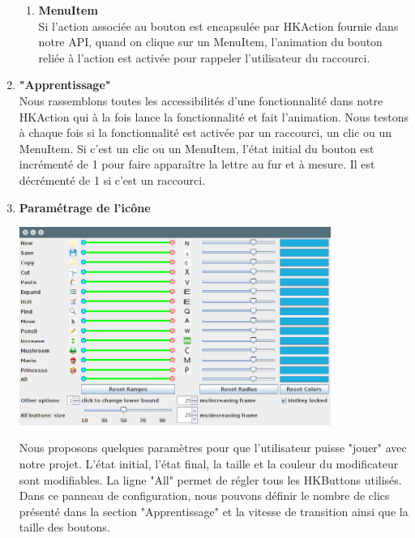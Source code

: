 \documentclass[12pt,a4paper]{article}
\begin{document}
\begin{enumerate}
\begin{enumerate}
\item {\large \textbf{MenuItem}}\\
Si l'action associée au bouton est encapsulée par HKAction fournie dans notre API, quand on clique sur un MenuItem, l'animation du bouton reliée à l'action est activée pour rappeler l'utilisateur du raccourci.
\end{enumerate}
\item {\large \textbf{"Apprentissage"}}\\
Nous rassemblons toutes les accessibilités d'une fonctionnalité dans notre HKAction qui à la fois lance la fonctionnalité et fait l'animation. Nous testons à chaque fois si la fonctionnalité est activée par un raccourci, un clic ou un MenuItem. Si c'est un clic ou un MenuItem, l'état initial du bouton est incrémenté de 1 pour faire apparaître la lettre au fur et à mesure. Il est décrémenté de 1 si c'est un raccourci. 
\item {\large \textbf{Paramétrage de l'icône}}\\
\begin{center}
	\includegraphics[width=0.8\textwidth]{11.png}
\end{center}
Nous proposons quelques paramètres pour que l'utilisateur puisse "jouer" avec notre projet. L'état initial, l'état final, la taille et la couleur du modificateur sont modifiables. La ligne "All" permet de régler tous les HKButtons utilisés. Dans ce panneau de configuration, nous pouvons définir le nombre de clics présenté dans la section "Apprentissage" et la vitesse de transition ainsi que la taille des boutons.
\end{enumerate}
\end{document}
